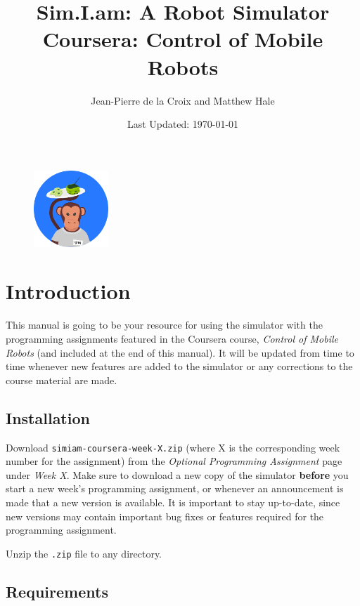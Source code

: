 \documentclass[10pt]{article}
\begin{document}
\begin{figure}
  \centering
  \includegraphics[width=0.25\textwidth]{images/simiam-round-logo.png}
\end{figure}

\title{{\huge{\bf{Sim.I.am: A Robot Simulator }}} \\
         Coursera: Control of Mobile Robots}
\author{Jean-Pierre de la Croix and Matthew Hale}
\date{Last Updated: \today}

\maketitle
\tableofcontents
\newpage
\section{Introduction}
This manual is going to be your resource for using the simulator with the programming assignments featured in the Coursera course, \textit{Control of Mobile Robots} (and included at the end of this manual). It will be updated from time to time whenever new features are added to the simulator or any corrections to the course material are made.

\subsection{Installation}

Download \texttt{simiam-coursera-week-X.zip} (where X is the corresponding week number for the assignment) from the \emph{Optional Programming Assignment} page under \emph{Week X}. Make sure to download a new copy of the simulator \textbf{before} you start a new week's programming assignment, or whenever an announcement is made that a new version is available. It is important to stay up-to-date, since new versions may contain important bug fixes or features required for the programming assignment.

Unzip the \texttt{.zip} file to any directory.

\subsection{Requirements}
\end{document}
